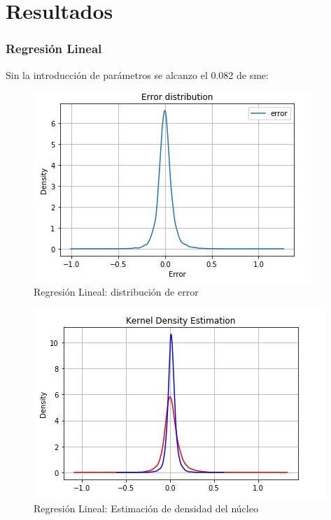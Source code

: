\newpage
\section{Resultados}
\subsubsection{Regresi\'on Lineal}
Sin la introducci\'on de par\'ametros se alcanzo el 0.082 de sme:

\begin{figure}[h!]
	\centering
	\includegraphics[width=0.8\linewidth]{Figure/LinearRegresionED_Results.JPG}
	\caption{Regresi\'on Lineal: distribuci\'on de error} 
	\label{fig:LinearRegresionED_Results}
\end{figure}

\begin{figure}[h!]
	\centering
	\includegraphics[width=0.8\linewidth]{Figure/LinearRegresionKernel_Results.JPG}
	\caption{Regresi\'on Lineal: Estimaci\'on de densidad del n\'ucleo} 
	\label{fig:LinearRegresionKernel_Results}
\end{figure}

